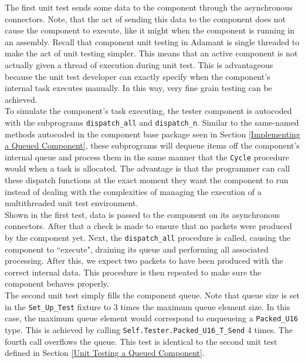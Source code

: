 The first unit test sends some data to the component through the asynchronous connectors. Note, that the act of sending this data to the component does not cause the component to execute, like it might when the component is running in an assembly. Recall that component unit testing in Adamant is single threaded to make the act of unit testing simpler. This means that an active component is not actually given a thread of execution during unit test. This is advantageous because the unit test developer can exactly specify when the component's internal task executes manually. In this way, very fine grain testing can be achieved. \\

To simulate the component's task executing, the tester component is autocoded with the subprograms \texttt{dispatch\_all} and \texttt{dispatch\_n}. Similar to the same-named methods autocoded in the component base package seen in Section \ref{Implementing a Queued Component}, these subprograms will dequeue items off the component's internal queue and process them in the same manner that the \texttt{Cycle} procedure would when a task is allocated. The advantage is that the programmer can call these dispatch functions at the exact moment they want the component to run instead of dealing with the complexities of managing the execution of a multithreaded unit test environment. \\

Shown in the first test, data is passed to the component on its asynchronous connectors. After that a check is made to ensure that no packets were produced by the component yet. Next, the \texttt{dispatch\_all} procedure is called, causing the component to ``execute", draining its queue and performing all associated processing. After this, we expect two packets to have been produced with the correct internal data. This procedure is then repeated to make sure the component behaves properly. \\

The second unit test simply fills the component queue. Note that queue size is set in the \texttt{Set\_Up\_Test} fixture to 3 times the maximum queue element size. In this case, the maximum queue element would correspond to enqueueing a \texttt{Packed\_U16} type. This is achieved by calling \texttt{Self.Tester.Packed\_U16\_T\_Send} 4 times. The fourth call overflows the queue. This test is identical to the second unit test defined in Section \ref{Unit Testing a Queued Component}. \\

